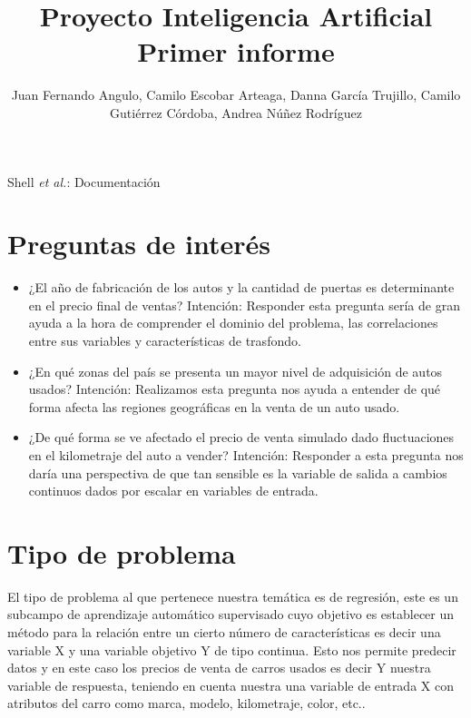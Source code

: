 \documentclass[journal]{..//IEEEtran/IEEEtran}
\begin{document}
\title{Proyecto Inteligencia Artificial\\Primer informe}

\author{Juan Fernando Angulo, Camilo Escobar Arteaga, Danna García Trujillo, Camilo Gutiérrez Córdoba, Andrea Núñez Rodríguez}
{Shell \MakeLowercase{\textit{et al.}}: Documentación}

\maketitle


\section{Preguntas de interés}


\begin{itemize}
    \item ¿El año de fabricación de los autos y la cantidad de puertas es determinante en el precio final de ventas? Intención: Responder esta pregunta sería de gran ayuda a la hora de comprender el dominio del problema, las correlaciones entre sus variables y características de trasfondo.
    \item ¿En qué zonas del país se presenta un mayor nivel de adquisición de autos usados? Intención: Realizamos esta pregunta nos ayuda a entender de qué forma afecta las regiones geográficas en la venta de un auto usado.
    \item ¿De qué forma se ve afectado el precio de venta simulado dado fluctuaciones en el kilometraje del auto a vender? Intención: Responder a esta pregunta nos daría una perspectiva de que tan sensible es la variable de salida a cambios continuos dados por escalar en variables de entrada. 
  
\end{itemize}
\section{Tipo de problema}
El tipo de problema al que pertenece nuestra temática es de regresión, este es un subcampo de aprendizaje automático supervisado cuyo objetivo es establecer un método para la relación entre un cierto número de características es decir una variable X y una variable objetivo Y de tipo continua.  Esto nos permite predecir datos y en este caso los precios de venta de carros usados es decir Y nuestra variable de respuesta, teniendo en cuenta nuestra una variable de entrada X con atributos del carro como marca, modelo, kilometraje, color, etc.. 
\end{document}
